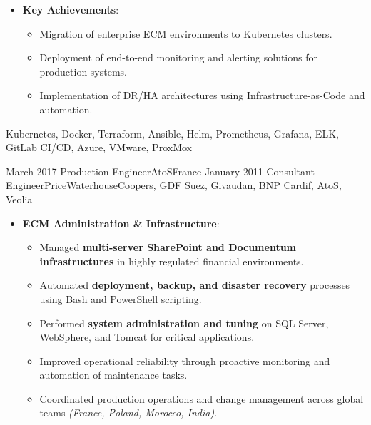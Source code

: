 \begin{experiences}
{\begin{itemize}[left=0pt,label={},itemsep=0.5em]
          \item \textbf{Key Achievements}:
            \begin{itemize}[itemsep=0.2em,topsep=0.2em,parsep=0pt]
              \small
              \item Migration of enterprise ECM environments to Kubernetes clusters.
              \item Deployment of end-to-end monitoring and alerting solutions for production systems.
              \item Implementation of DR/HA architectures using Infrastructure-as-Code and automation.
            \end{itemize}
        \end{itemize}
        \vspace{0.5em}  %
    }
    {Kubernetes, Docker, Terraform, Ansible, Helm, Prometheus, Grafana, ELK, GitLab CI/CD, Azure, VMware, ProxMox}

\emptySeparator
\emptySeparator

\consultantexperience
    {March 2017}       {Production Engineer}{AtoS}{France}
    {January 2011}    {Consultant Engineer}{PriceWaterhouseCoopers, GDF Suez, Givaudan, BNP Cardif, AtoS, Veolia} {
        \begin{itemize}[left=0pt,label={},itemsep=0.4em]
        \vspace{0.5em}  %
          \item \textbf{ECM Administration \& Infrastructure}:
            \begin{itemize}[itemsep=0.15em,topsep=0.1em,parsep=0pt]
              \small
              \item Managed \textbf{multi-server SharePoint and Documentum infrastructures} in highly regulated financial environments.
              \item Automated \textbf{deployment, backup, and disaster recovery} processes using Bash and PowerShell scripting.
              \item Performed \textbf{system administration and tuning} on SQL Server, WebSphere, and Tomcat for critical applications.
              \item Improved operational reliability through proactive monitoring and automation of maintenance tasks.
              \item Coordinated production operations and change management across global teams \emph{(France, Poland, Morocco, India)}.
            \end{itemize}


\end{itemize}}
\end{experiences}
